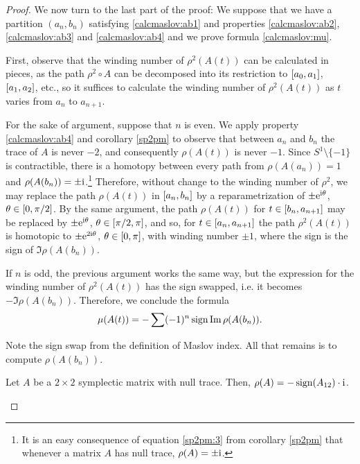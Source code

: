 \begin{proof}
\smallskip

We now turn to the last part of the proof: We suppose that we have a partition $(a_n, b_n)$ satisfying \eqref{calcmaslov:ab1} and properties \ref{calcmaslov:ab2}, \ref{calcmaslov:ab3} and \ref{calcmaslov:ab4} and we prove formula \eqref{calcmaslov:mu}.

First, observe that the winding number of $\rho^2(A(t))$ can be calculated in pieces, as the path $\rho^2 \circ A$ can be decomposed into its restriction to $\interval{a_0}{a_1}$, $\interval{a_1}{a_2}$, etc., so it suffices to calculate the winding number of $\rho^2(A(t))$ as $t$ varies from $a_n$ to $a_{n+1}$.

For the sake of argument, suppose that $n$ is even. We apply property \ref{calcmaslov:ab4} and corollary \ref{sp2pm} to observe that between $a_n$ and $b_n$ the trace of $A$ is never $-2$, and consequently $\rho(A(t))$ is never $-1$. Since $S^1 \setminus \{-1\}$ is contractible, there is a homotopy between every path from $\rho(A(a_n)) = 1$ and $\rho(A(b_n)) = \pm\mathrm{i}$.\footnote{It is an easy consequence of equation \eqref{sp2pm:3} from corollary \ref{sp2pm} that whenever a matrix $A$ has null trace, $\rho(A) = \pm \mathrm{i}$.} Therefore, without change to the winding number of $\rho^2$, we may replace the path $\rho(A(t))$ in $\interval{a_n}{b_n}$ by a reparametrization of $\pm \mathrm{e}^{\mathrm{i} \theta}$, $\theta \in \interval 0 {\pi/2}$. By the same argument, the path $\rho(A(t))$ for $t \in \interval{b_n}{a_{n+1}}$ may be replaced by $\pm \mathrm{e}^{\mathrm{i} \theta}$, $\theta \in \interval{\pi/2}\pi$, and so, for $t \in \interval{a_n}{a_{n+1}}$ the path $\rho^2(A(t))$ is homotopic to $\pm \mathrm{e}^{2 \mathrm{i} \theta}$, $\theta \in \interval 0 \pi$, with winding number $\pm 1$, where the sign is the sign of $\Im \rho(A(b_n))$.

If $n$ is odd, the previous argument works the same way, but the expression for the winding number of $\rho^2(A(t))$ has the sign swapped, i.e. it becomes $- \Im \rho(A(b_n))$. Therefore, we conclude the formula
\begin{equation}
\mu(A(t)) = -\sum (-1)^n \operatorname{sign} \operatorname{Im} \rho(A(b_n)).
\end{equation}

Note the sign swap from the definition of Maslov index. All that remains is to compute $\rho(A(b_n))$.

\begin{lemma}
Let $A$ be a $2 \times 2$ symplectic matrix with null trace. Then, $\rho(A) = -\operatorname{sign}(A_{12}) \cdot  \mathrm{i}$.
\end{lemma}


\end{proof}
